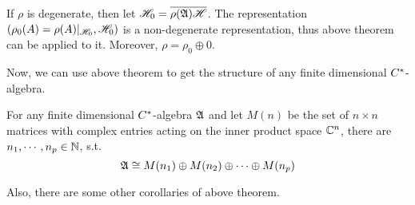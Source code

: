 \documentclass[a4paper,11pt]{report}
\begin{document}
\begin{rem}
	If $\rho$ is degenerate, then let $\mathscr{H}_0 = \overline{\rho(\mathfrak{A}) \mathscr{H}}$. The representation $(\rho_0(A) = \rho(A)|_{\mathscr{H}_0}, \mathscr{H}_0)$ is a non-degenerate representation, thus above theorem can be applied to it. Moreover, $\rho = \rho_0 \oplus 0$. 
\end{rem}

Now, we can use above theorem to get the structure of any finite dimensional $C^{*}$-algebra.
\begin{cor}
	For any finite dimensional $C^{*}$-algebra $\mathfrak{A}$ and let $M(n)$ be the set of $n \times n$ matrices with complex entries acting on the inner product space $\mathbb{C}^{n}$, there are $n_1,\cdots,n_p \in \mathbb{N}$, s.t.
	\begin{equation*}
		\mathfrak{A} \cong M(n_1) \oplus M(n_2) \oplus \cdots \oplus M(n_p)
	\end{equation*}
\end{cor}

Also, there are some other corollaries of above theorem.
\end{document}
